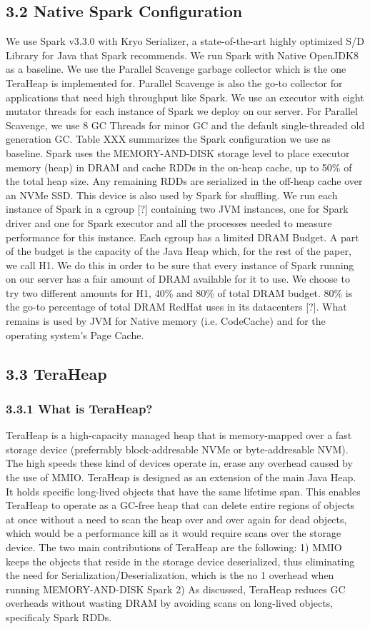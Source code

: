 \documentclass[twocolumn,10pt]{asme2e}
\begin{document}
\subsection*{3.2 Native Spark Configuration}
We use Spark v3.3.0 with Kryo Serializer, a state-of-the-art highly optimized S/D Library for Java that Spark recommends. We run Spark with Native OpenJDK8 as a baseline. We use the Parallel Scavenge garbage collector which is the one TeraHeap is implemented for. Parallel Scavenge is also the go-to collector for applications that need high throughput like Spark. We use an executor with eight mutator threads for each instance of Spark we deploy on our server. For Parallel Scavenge, we use 8 GC Threads for minor GC and the default single-threaded old generation GC. Table XXX summarizes the Spark configuration we use as baseline. Spark uses the MEMORY-AND-DISK storage level to place executor memory (heap) in DRAM and cache RDDs in the on-heap cache, up to 50\% of the total heap size. Any remaining RDDs are serialized in the off-heap cache over an NVMe SSD. This device is also used by Spark for shuffling. We run each instance of Spark in a cgroup [?] containing two JVM instances, one for Spark driver and one for Spark executor and all the processes needed to measure performance for this instance. Each cgroup has a limited DRAM Budget. A part of the budget is the capacity of the Java Heap which, for the rest of the paper, we call H1. We do this in order to be sure that every instance of Spark running on our server has a fair amount of DRAM available for it to use. We choose to try two different amounts for H1, 40\% and 80\% of total DRAM budget. 80\% is the go-to percentage of total DRAM RedHat uses in its datacenters [?]. What remains is used by JVM for Native memory (i.e. CodeCache) and for the operating system's Page Cache.   

\subsection*{3.3 TeraHeap}
\subsubsection*{3.3.1 What is TeraHeap?}
TeraHeap is a high-capacity managed heap that is memory-mapped over a fast storage device (preferrably block-addresable NVMe or byte-addresable NVM). The high speeds these kind of devices operate in, erase any overhead caused by the use of MMIO. TeraHeap is designed as an extension of the main Java Heap. It holds specific long-lived objects that have the same lifetime span. This enables TeraHeap to operate as a GC-free heap that can delete entire regions of objects at once without a need to scan the heap over and over again for dead objects, which would be a performance kill as it would require scans over the storage device. The two main contributions of TeraHeap are the following: 1) MMIO keeps the objects that reside in the storage device deserialized, thus eliminating the need for Serialization/Deserialization, which is the no 1 overhead when running MEMORY-AND-DISK Spark 2) As discussed, TeraHeap reduces GC overheads without wasting DRAM by avoiding scans on long-lived objects, specificaly Spark RDDs.
\end{document}
